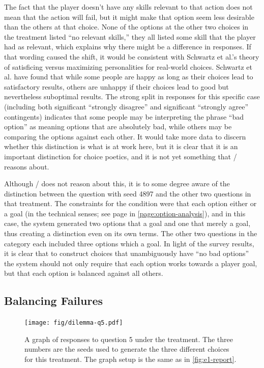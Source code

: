 The fact that the player doesn't have any skills relevant to that action does not mean that the action will fail, but it might make that option seem less desirable than the others at that choice.
%
None of the options at the other two choices in the \rlx{} treatment listed ``no relevant skills,'' they all listed some skill that the player had as relevant, which explains why there might be a difference in responses.
%
If that wording caused the shift, it would be consistent with Schwartz et al.'s theory of satisficing versus maximizing personalities \citep{Schwartz2002} for real-world choices.
%
Schwartz et al. have found that while some people are happy as long as their choices lead to satisfactory results, others are unhappy if their choices lead to good but nevertheless suboptimal results.
%
The strong split in responses for this specific case (including both significant ``strongly disagree'' and significant ``strongly agree'' contingents) indicates that some people may be interpreting the phrase ``bad option'' as meaning options that are absolutely bad, while others may be comparing the options against each other.
%
It would take more data to discern whether this distinction is what is at work here, but it is clear that it is an important distinction for choice poetics, and it is not yet something that \dunyazad/ reasons about.


Although \dunyazad/ does not reason about this, it is to some degree aware of the distinction between the question with seed 4897 and the other two questions in that treatment.
%
The constraints for the \rlx{} condition were that each option either  or  a goal (in the technical senses; see page \pageref{page:option-analysis} in \cref{page:option-analysis}), and in this case, the system generated two options that  a goal and one that merely  a goal, thus creating a distinction even on its own terms.
%
The other two questions in the \rlx{} category each included three options which  a goal.
%
In light of the survey results, it is clear that to construct choices that unambiguously have ``no bad options'' the system should not only require that each option works towards a player goal, but that each option is balanced against all others.


\subsection{Balancing Failures}

\begin{figure}[!t]
  \texttt{[image: fig/dilemma-q5.pdf]}
  \caption[``Balanced options'' responses for dilemmas]{A graph of responses to question 5 under the \dlm{} treatment. The three numbers are the seeds used to generate the three different choices for this treatment. The graph setup is the same as in \cref{fig:e1-report}.}
  \label{fig:e1-dilemmaq5}
\end{figure}

